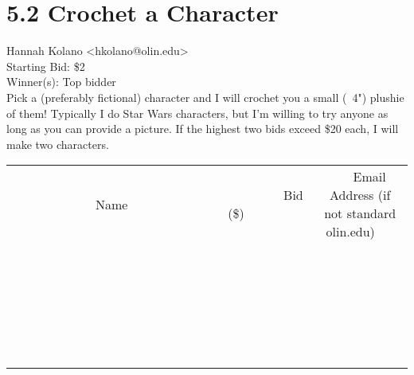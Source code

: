 \documentclass[11pt]{article}
\begin{document}
					\section*{5.2 Crochet a Character}
					Hannah Kolano <hkolano@olin.edu> \\
					Starting Bid: \$2 \\
					Winner(s): Top bidder \\
					Pick a (preferably fictional) character and I will crochet you a small (~4") plushie of them! Typically I do Star Wars characters, but I'm willing to try anyone as long as you can provide a picture. If the highest two bids exceed \$20 each, I will make two characters. \\
					[6ex]
					\begin{tabular}{c c c}
						~~~~~~~~~~~~~Name~~~~~~~~~~~~~ & ~~~~~~~~~Bid (\$)~~~~~~~~~ & ~~~Email Address (if not standard olin.edu)~~~ \\
				
 & & \\
\hline
 & & \\
\hline
 & & \\
\hline
 & & \\
\hline
 & & \\
\hline
 & & \\
\hline
 & & \\
\hline
 & & \\
\hline
 & & \\
\hline
 & & \\
\hline
 & & \\
\hline
 & & \\
\hline
 & & \\
\hline
 & & \\
\hline
 & & \\
\hline
 & & \\
\hline
 & & \\
\hline
 & & \\
\hline
 & & \\
\hline
 & & \\
\hline
 & & \\
\hline
 & & \\
\hline
 & & \\
\hline
 & & \\
\hline
 & & \\
\hline
 & & \\
\hline
					\end{tabular}
					\clearpage
				
\end{document}
